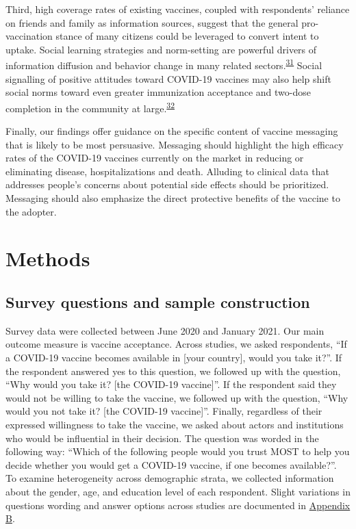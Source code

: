 \documentclass[
  12pt,
]{article}
\begin{document}
Third, high coverage rates of existing vaccines, coupled with respondents' reliance on friends and family as information sources, suggest that the general pro-vaccination stance of many citizens could be leveraged to convert intent to uptake. Social learning strategies and norm-setting are powerful drivers of information diffusion and behavior change in many related sectors.\textsuperscript{\protect\hyperlink{ref-beaman2021can}{31}} Social signalling of positive attitudes toward COVID-19 vaccines may also help shift social norms toward even greater immunization acceptance and two-dose completion in the community at large.\textsuperscript{\protect\hyperlink{ref-karing2018social}{32}}

Finally, our findings offer guidance on the specific content of vaccine messaging that is likely to be most persuasive. Messaging should highlight the high efficacy rates of the COVID-19 vaccines currently on the market in reducing or eliminating disease, hospitalizations and death. Alluding to clinical data that addresses people's concerns about potential side effects should be prioritized. Messaging should also emphasize the direct protective benefits of the vaccine to the adopter.

\hypertarget{methods}{%
\section*{Methods}\label{methods}}

\hypertarget{survey-questions-and-sample-construction}{%
\subsection*{Survey questions and sample construction}\label{survey-questions-and-sample-construction}}

Survey data were collected between June 2020 and January 2021. Our main outcome measure is vaccine acceptance. Across studies, we asked respondents, ``If a COVID-19 vaccine becomes available in {[}your country{]}, would you take it?''. If the respondent answered yes to this question, we followed up with the question, ``Why would you take it? {[}the COVID-19 vaccine{]}''. If the respondent said they would not be willing to take the vaccine, we followed up with the question, ``Why would you not take it? {[}the COVID-19 vaccine{]}''. Finally, regardless of their expressed willingness to take the vaccine, we asked about actors and institutions who would be influential in their decision. The question was worded in the following way: ``Which of the following people would you trust MOST to help you decide whether you would get a COVID-19 vaccine, if one becomes available?''. To examine heterogeneity across demographic strata, we collected information about the gender, age, and education level of each respondent. Slight variations in questions wording and answer options across studies are documented in \protect\hyperlink{appendixb}{Appendix B}.
\end{document}
